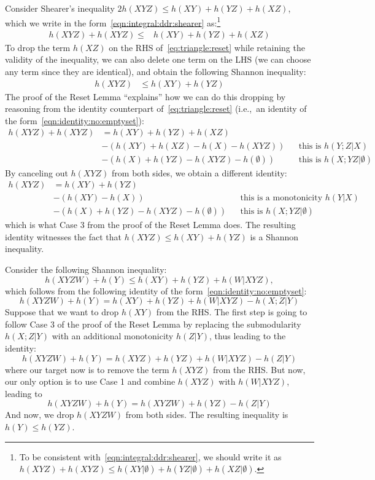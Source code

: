 \documentclass{theoretics}
\begin{document}
\begin{example}
  Consider Shearer's inequality $2h(XYZ) \leq h(XY)+h(YZ)+h(XZ)$, which we write in the
  form~\eqref{eqn:integral:ddr:shearer} as:\footnote{To be consistent
  with~\eqref{eqn:integral:ddr:shearer}, we should write it as $h(XYZ)+h(XYZ)\leq
  h(XY|\emptyset)+h(YZ|\emptyset)+h(XZ|\emptyset)$.}
%
  \begin{align}
    h(XYZ)+h(XYZ) \leq & h(XY)+h(YZ)+h(XZ) \label{eq:triangle:reset}
  \end{align}
%
  To drop the term $h(XZ)$ on the RHS of~\eqref{eq:triangle:reset} while retaining the
  validity of the inequality, we can also delete one term on the LHS (we can choose any term since they are
  identical), and obtain the following Shannon inequality:
%
  \begin{align*}
    h(XYZ) & \leq h(XY)+h(YZ)
  \end{align*}
  The proof of the Reset Lemma ``explains'' how we can do this dropping by reasoning
  from the identity counterpart of~\eqref{eq:triangle:reset} (i.e.,~an identity of
the form~\eqref{eqn:identity:no:emptyset}):
  \begin{align}
    h(XYZ)+h(XYZ)
      &= h(XY)+h(YZ)+h(XZ)\nonumber\\
    &- (h(XY)+h(XZ)-h(X)-h(XYZ)) && \text{this is } h(Y;Z | X)\nonumber\\
    &-  (h(X)+h(YZ)-h(XYZ)-h(\emptyset)) && \text{this is } h(X; YZ | \emptyset)
  \label{eq:triangle:reset:identity}
  \end{align}
  By canceling out $h(XYZ)$ from both sides, we obtain a different identity:
  \begin{align}
    h(XYZ)&= h(XY)+h(YZ)\nonumber\\
&-(h(XY) - h(X)) && \text{this is a monotonicity } h(Y|X)\nonumber\\
&-(h(X)+h(YZ)-h(XYZ)-h(\emptyset))  && \text{this is } h(X; YZ | \emptyset)\label{eq:triangle:reset:identity2}
  \end{align}
which is what Case 3 from the proof of the Reset Lemma does.
The resulting identity witnesses the fact that $h(XYZ) \leq h(XY)+h(YZ)$ is a Shannon inequality.
\end{example}

\begin{example}
  Consider the following Shannon inequality:
  \[h(XYZW) + h(Y) \leq h(XY) + h(YZ) + h(W|XYZ),\]
  which follows from the following identity of the form~\eqref{eqn:identity:no:emptyset}:
  \[h(XYZW) + h(Y) = h(XY) + h(YZ) + h(W|XYZ) - h(X;Z|Y)\]
  Suppose that we
  want to drop $h(XY)$ from the RHS. The first step is going to
  follow Case 3 of the proof of the Reset Lemma by
  replacing the submodularity $h(X;Z|Y)$ with an additional monotonicity $h(Z|Y)$, thus leading to the identity:
  \[h(XYZW) + h(Y) = h(XYZ) + h(YZ) + h(W|XYZ) - h(Z|Y)\] where our target
  now is to remove the term $h(XYZ)$ from the RHS.  But now, our
  only option is to use Case 1 and combine $h(XYZ)$ with $h(W|XYZ)$, leading to
  \[h(XYZW) + h(Y) = h(XYZW) + h(YZ) - h(Z|Y)\] And now, we drop $h(XYZW)$
  from both sides. The resulting inequality is $h(Y) \leq h(YZ)$.
\end{example}
\end{document}
